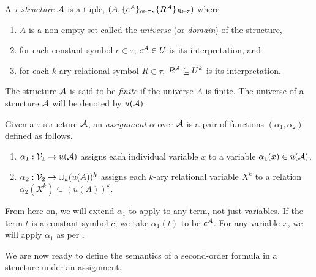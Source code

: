 \documentclass[11pt,twoside=off,numbers=noenddot]{scrbook}
\begin{document}
\begin{definition}
  A \emph{$\tau$-structure} $\mathcal{A}$ is a tuple, $(A, \{ c^{\mathcal{A}} \}_{c \in \tau}, \{ R^{\mathcal{A}} \}_{R \in \tau})$ where
  \begin{enumerate}
    \item $A$ is a non-empty set called the \emph{universe} (or \emph{domain}) of the structure,
    \item for each constant symbol $c \in \tau$, $c^{\mathcal{A}} \in U$ is its interpretation, and
    \item for each $k$-ary relational symbol $R \in \tau$, $R^{\mathcal{A}} \subseteq U^k$ is its interpretation.
  \end{enumerate}
\end{definition}

The structure $\mathcal{A}$ is said to be \emph{finite} if the universe $A$ is finite. The universe of a structure $\mathcal{A}$ will be denoted by $u(\mathcal{A})$.

\begin{definition}
  Given a $\tau$-structure $\mathcal{A}$, an \emph{assignment} $\alpha$ over $\mathcal{A}$ is a pair of functions $(\alpha_1, \alpha_2)$ defined as follows.
  \begin{enumerate}
    \item $\alpha_1 : \mathcal{V}_1 \to u(\mathcal{A})$ assigns each individual variable $x$ to a variable $\alpha_1(x) \in u(\mathcal{A})$.
    \item $\alpha_2 : \mathcal{V}_2 \to \cup_k (u(A))^k$ assigns each $k$-ary relational variable $X^k$ to a relation $\alpha_2(X^k) \subseteq (u(A))^k$.
  \end{enumerate}
\end{definition}

\begin{abuse}
  From here on, we will extend $\alpha_1$ to apply to any term, not just variables. If the term $t$ is a constant symbol $c$, we take $\alpha_1(t)$ to be $c^{\mathcal{A}}$. For any variable $x$, we will apply $\alpha_1$ as per .
\end{abuse}

We are now ready to define the semantics of a second-order formula in a structure under an assignment.
\end{document}
